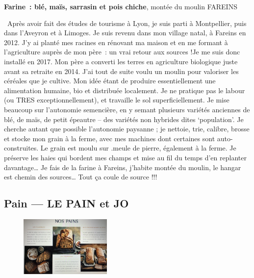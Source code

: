 \documentclass[10pt,a4paper,french]{article}
\makeatletter
\newcommand{\authoredby}[1]{\addtocontents{toc}{\protect\@nameuse{authoredby#1}}}%
\makeatother
\begin{document}
\newline
{\bf Farine\ : blé, maïs, sarrasin et pois chiche}, montée du moulin FAREINS\newline

\noindent\guillemotleft\ Après avoir fait des études de tourisme à
Lyon, je suis parti à Montpellier, puis dans l’Aveyron et à
Limoges. Je suis revenu dans mon village natal, à Fareins en 2012. J’y
ai planté mes racines en rénovant ma maison et en me formant à
l’agriculture auprès de mon père\ : un vrai retour aux sources !Je me
suis donc installé en 2017. Mon père a converti les terres en
agriculture biologique juste avant sa retraite en 2014. J’ai tout de
suite voulu un moulin pour valoriser les céréales que je cultive. Mon
idée étant de produire essentiellement une alimentation humaine, bio
et distribuée localement.  Je ne pratique pas le labour (ou TRES
exceptionnellement), et travaille le sol superficiellement. Je mise
beaucoup sur l’autonomie semencière, en y semant plusieurs variétés
anciennes de blé, de maïs, de petit épeautre – des variétés non
hybrides dites ‘population’. Je cherche autant que possible
l’autonomie paysanne ; je nettoie, trie, calibre, brosse et stocke mon
grain à la ferme, avec mes machines dont certaines sont
auto-construites. Le grain est moulu sur .meule de pierre, également à
la ferme.  Je préserve les haies qui bordent mes champs et mise au fil
du temps d’en replanter davantage…  Je fais de la farine à Fareins,
j’habite montée du moulin, le hangar est chemin des sources…  Tout ça
coule de source !!! \guillemotright

\newpage

\authoredby{B}
\subsection{Pain --- LE PAIN et JO}\label{subsec:pain}

\begin{figure}
\includegraphics[width=0.4\textwidth]{Pain.jpg}
\end{figure}
\end{document}
